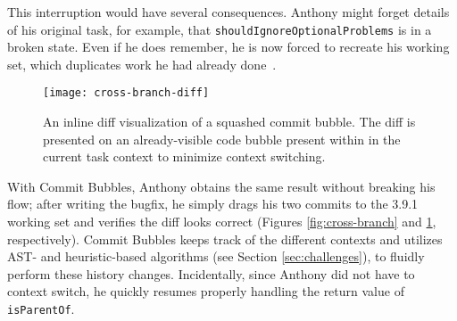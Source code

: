 \documentclass[conference]{IEEEtran}
\begin{document}
This interruption would have several consequences.
Anthony might forget details of his original task, for example, that \texttt{shouldIgnoreOptionalProblems} is in a broken state.
Even if he does remember, he is now forced to recreate his working set, which duplicates work he had already done~\cite{Ko2006}.

\begin{figure}
\centering
\texttt{[image: cross-branch-diff]}
\caption{An inline diff visualization of a squashed commit bubble. The diff is presented on an already-visible code bubble present within in the current task context to minimize context switching.}
\label{fig:diff}
\end{figure}

With Commit Bubbles, Anthony obtains the same result without breaking his flow; after writing the bugfix, he simply drags his two commits to the 3.9.1 working set and verifies the diff looks correct (Figures \ref{fig:cross-branch} and \ref{fig:diff}, respectively).
Commit Bubbles keeps track of the different contexts and utilizes AST- and heuristic-based algorithms (see Section \ref{sec:challenges}), to fluidly perform these history changes.
Incidentally, since Anthony did not have to context switch, he quickly resumes properly handling the return value of \texttt{isParentOf}.


\end{document}
